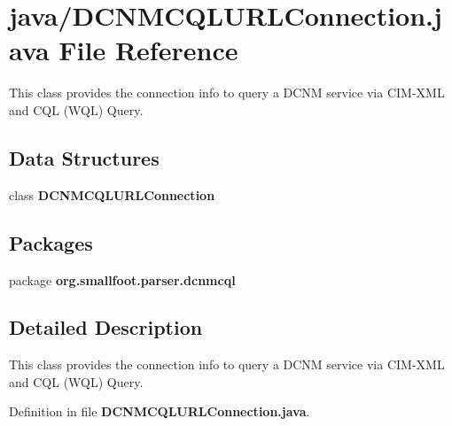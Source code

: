 \section{java/\+D\+C\+N\+M\+C\+Q\+L\+U\+R\+L\+Connection.java File Reference}
\label{DCNMCQLURLConnection_8java}


This class provides the connection info to query a D\+C\+N\+M service via C\+I\+M-\/\+X\+M\+L and C\+Q\+L (W\+Q\+L) Query.  


\subsection*{Data Structures}
\begin{DoxyCompactItemize}
\item 
class {\bf D\+C\+N\+M\+C\+Q\+L\+U\+R\+L\+Connection}
\end{DoxyCompactItemize}
\subsection*{Packages}
\begin{DoxyCompactItemize}
\item 
package {\bf org.\+smallfoot.\+parser.\+dcnmcql}
\end{DoxyCompactItemize}


\subsection{Detailed Description}
This class provides the connection info to query a D\+C\+N\+M service via C\+I\+M-\/\+X\+M\+L and C\+Q\+L (W\+Q\+L) Query. 



Definition in file {\bf D\+C\+N\+M\+C\+Q\+L\+U\+R\+L\+Connection.\+java}.

